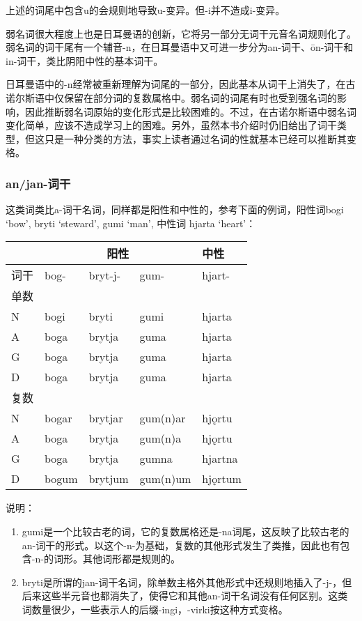 上述的词尾中包含u的会规则地导致u-变异。但-i并不造成i-变异。

弱名词很大程度上也是日耳曼语的创新，它将另一部分无词干元音名词规则化了。弱名词的词干尾有一个辅音-n，在日耳曼语中又可进一步分为an-词干、ōn-词干和in-词干，类比阴阳中性的基本词干。

日耳曼语中的-n经常被重新理解为词尾的一部分，因此基本从词干上消失了，在古诺尔斯语中仅保留在部分词的复数属格中。弱名词的词尾有时也受到强名词的影响，因此推断弱名词原始的变化形式是比较困难的。不过，在古诺尔斯语中弱名词变化简单，应该不造成学习上的困难。另外，虽然本书介绍时仍旧给出了词干类型，但这只是一种分类的方法，事实上读者通过名词的性就基本已经可以推断其变格。

\subsubsection{an/jan-词干}\label{anjan-ux8bcdux5e72}

这类词类比a-词干名词，同样都是阳性和中性的，参考下面的例词，阳性词bogi
`bow', bryti `steward', gumi `man', 中性词 hjarta `heart'：

\begin{longtable}{lllll}
\toprule
 &\multicolumn{3}{c}{阳性} & 中性 \\
\midrule
\endhead
\bottomrule
\endfoot
词干 & bog- & bryt-j- & gum- & hjart- \\
单数 & & & & \\
N & bogi & bryti & gumi & hjarta \\
A & boga & brytja & guma & hjarta \\
G & boga & brytja & guma & hjarta \\
D & boga & brytja & guma & hjarta \\
复数 & & & & \\
N & bogar & brytjar & gum(n)ar & hjǫrtu \\
A & boga & brytja & gum(n)a & hjǫrtu \\
G & boga & brytja & gumna & hjartna \\
D & bogum & brytjum & gum(n)um & hjǫrtum \\
\end{longtable}

说明：

\begin{enumerate}
\def\labelenumi{\arabic{enumi})}
\item
  gumi是一个比较古老的词，它的复数属格还是-na词尾，这反映了比较古老的an-词干的形式。以这个-n-为基础，复数的其他形式发生了类推，因此也有包含-n-的词形。其他词形都是规则的。
\item
  bryti是所谓的jan-词干名词，除单数主格外其他形式中还规则地插入了-j-，但后来这些半元音也都消失了，使得它和其他an-词干名词没有任何区别。这类词数量很少，一些表示人的后缀-ingi，-virki按这种方式变格。
\end{enumerate}

